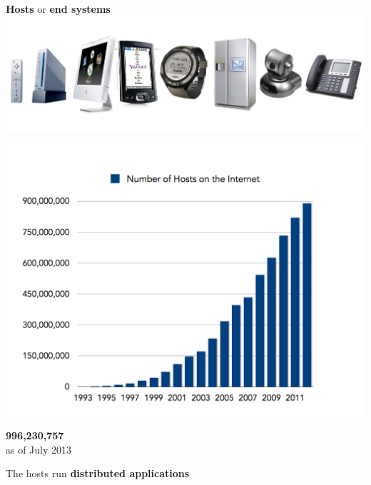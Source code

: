 \begin{frame}[plain]\begin{center}\large
		\textbf{Hosts} or \textbf{end systems} \\
		\includegraphics[width=\linewidth]{figures/end-host-examples.jpg}
\end{center}\end{frame}

\begin{frame}[plain]\begin{center}\large
		\includegraphics[width=\linewidth]{figures/num-of-hosts-chart.png}
\end{center}\end{frame}

\begin{frame}
\begin{center}
\Huge
\textbf{996,230,757}\\
\large
as of July 2013
\end{center}
\end{frame}

\begin{frame}\begin{center}
\large
The hosts run \textbf{distributed applications}
\end{center}\end{frame}

